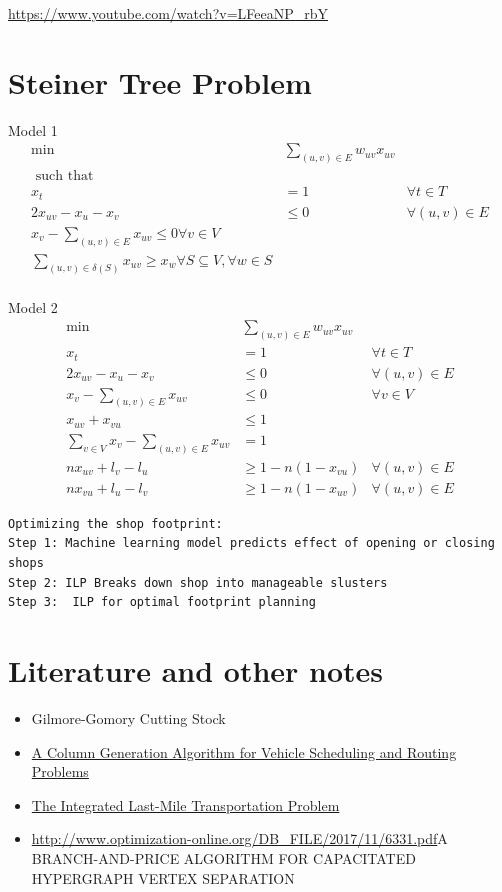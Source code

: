 \url{https://www.youtube.com/watch?v=LFeeaNP_rbY}

\section{Steiner Tree Problem}


Model 1
\begin{align*}
\min \ \ \ & \sum_{(u,v) \in E} w_{uv} x_{uv}\\
\text{ such that }  \ \ \ \\
x_t & = 1 & \forall t \in T \\
2x_{uv} - x_u - x_v &\leq 0 &   \forall (u,v) \in E\\
x_v - \sum_{(u,v) \in E} x_{uv} \leq 0 \forall v \in V\\
\sum_{(u,v) \in \delta(S)} x_{uv} \geq x_w \forall S \subseteq V, \forall w \in S\\
\end{align*}

Model 2
\begin{align*}
\min &\sum_{(u,v) \in E} w_{uv} x_{uv}\\
x_t &= 1 &\forall t \in T\\
2x_{uv} - x_u - x_v &\leq 0 & \forall (u,v) \in E\\
x_v - \sum_{(u,v) \in E} x_{uv} &\leq 0 &\forall v \in V\\
x_{uv} + x_{vu} &\leq 1\\
\sum_{v \in V} x_v - \sum_{(u,v) \in E} x_{uv} &=1&\\
n x_{uv} + l_v - l_u &\geq 1 - n(1-x_{vu}) &\forall (u,v) \in E\\
n x_{vu} + l_u - l_v &\geq 1 - n(1-x_{uv}) &\forall (u,v) \in E
\end{align*}

\begin{verbatim}
Optimizing the shop footprint:
Step 1: Machine learning model predicts effect of opening or closing shops
Step 2: ILP Breaks down shop into manageable slusters
Step 3:  ILP for optimal footprint planning
\end{verbatim}




\section{Literature and other notes}


\begin{itemize}
\item Gilmore-Gomory Cutting Stock~\cite{Gilmore-Gomory}
\item \href{http://www.optimization-online.org/DB_HTML/2018/06/6648.html}{A Column Generation Algorithm for Vehicle Scheduling and Routing Problems}
\item \href{http://www.optimization-online.org/DB_HTML/2018/06/6670.html}{The Integrated Last-Mile Transportation Problem}
\item \url{http://www.optimization-online.org/DB_FILE/2017/11/6331.pdf}{A BRANCH-AND-PRICE ALGORITHM FOR CAPACITATED
HYPERGRAPH VERTEX SEPARATION}
\end{itemize}
